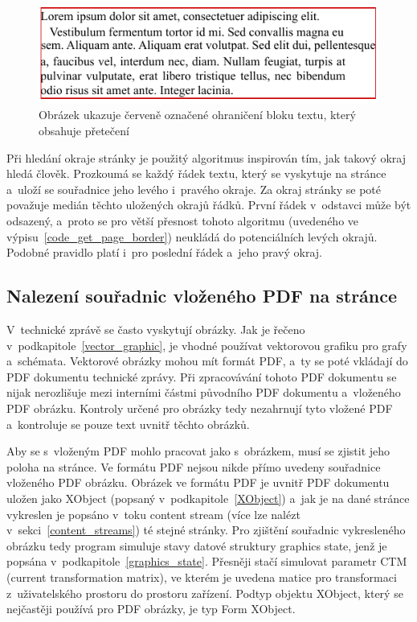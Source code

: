 \begin{figure}[H]
    \centering
    \includegraphics[width=0.7\linewidth]{obrazky-figures/block_bbox.pdf}
    \caption{Obrázek ukazuje červeně označené ohraničení bloku textu, který obsahuje přetečení}
    \label{pic_block_bbox}
\end{figure}

Při hledání okraje stránky je použitý algoritmus inspirován tím, jak takový
okraj hledá člověk. Prozkoumá se každý řádek textu, který se vyskytuje na
stránce a~uloží se souřadnice jeho levého i~pravého okraje. Za okraj stránky se
poté považuje medián těchto uložených okrajů řádků. První řádek v~odstavci 
může být odsazený, a~proto se pro větší přesnost tohoto algoritmu (uvedeného
ve výpisu~\ref{code_get_page_border}) neukládá do potenciálních levých okrajů.
Podobné pravidlo platí i~pro poslední řádek a~jeho pravý okraj.

\noindent\begin{minipage}{\linewidth}
    \hfill
    
\end{minipage}
 

\subsection*{Nalezení souřadnic vloženého PDF na stránce}
V~technické zprávě se často vyskytují obrázky. Jak je řečeno 
v~podkapitole~\ref{vector_graphic}, je vhodné používat vektorovou grafiku
pro grafy a~schémata. Vektorové obrázky mohou mít formát PDF, a~ty se poté
vkládají do PDF dokumentu technické zprávy. Při zpracovávání tohoto PDF dokumentu
se nijak nerozlišuje mezi interními částmi původního PDF dokumentu a~vloženého
PDF obrázku. Kontroly určené pro obrázky tedy nezahrnují tyto vložené PDF
a~kontroluje se pouze text uvnitř těchto obrázků.

Aby se s~vloženým PDF mohlo pracovat jako s~obrázkem, musí se zjistit
jeho poloha na stránce. Ve formátu PDF nejsou nikde přímo uvedeny souřadnice
vloženého PDF obrázku. Obrázek ve formátu PDF je uvnitř PDF dokumentu uložen
jako XObject (popsaný v~podkapitole~\ref{XObject}) a~jak je na dané stránce
vykreslen je popsáno v~toku content stream (více lze nalézt
v~sekci~\ref{content_streams}) té stejné stránky.
Pro zjištění souřadnic vykresleného obrázku tedy program simuluje
stavy datové struktury graphics state, jenž je popsána
v~podkapitole~\ref{graphics_state}. Přesněji stačí simulovat parametr
CTM (current transformation matrix), ve kterém je uvedena matice pro transformaci
z~uživatelského prostoru do prostoru zařízení. Podtyp objektu XObject, který se
nejčastěji používá pro PDF obrázky, je typ Form XObject.

